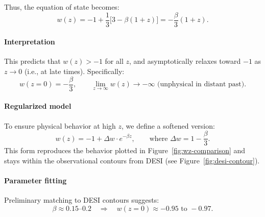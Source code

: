 \documentclass{article}
\begin{document}
Thus, the equation of state becomes:
\begin{equation}
  w(z) = -1 + \frac{1}{3} \big[ 3 - \beta (1+z) \big]
  = -\frac{\beta}{3}(1+z).
\end{equation}

\paragraph{Interpretation}
This predicts that \( w(z) > -1 \) for all \( z \), and asymptotically relaxes toward $-1$ as $z \rightarrow 0$ (i.e., at late times). Specifically:
\[
  w(z=0) = -\frac{\beta}{3}, \qquad
  \lim_{z \to \infty} w(z) \to -\infty \text{ (unphysical in distant past)}.
\]

\paragraph{Regularized model}
To ensure physical behavior at high $z$, we define a softened version:
\begin{equation}
  w(z) = -1 + \Delta w \cdot e^{-\beta z},
  \qquad \text{where } \Delta w = 1 - \frac{\beta}{3}.
\end{equation}
This form reproduces the behavior plotted in Figure~\ref{fig:wz-comparison} and stays within the observational contours from DESI (see Figure~\ref{fig:desi-contour}).

\paragraph{Parameter fitting}
Preliminary matching to DESI contours suggests:
\[
  \beta \approx 0.15\text{–}0.2
  \quad \Rightarrow \quad
  w(z=0) \approx -0.95\text{ to }-0.97.
\]

\medskip
\begin{center}
\end{center}
\medskip
\end{document}
